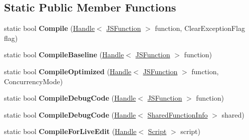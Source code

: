 \subsection*{Static Public Member Functions}
\begin{DoxyCompactItemize}
\item 
static bool {\bfseries Compile} (\hyperlink{classv8_1_1internal_1_1_handle}{Handle}$<$ \hyperlink{classv8_1_1internal_1_1_j_s_function}{J\+S\+Function} $>$ function, Clear\+Exception\+Flag flag)\hypertarget{classv8_1_1internal_1_1_compiler_afbc8e9fe9de9febf48d6c71c79978671}{}\label{classv8_1_1internal_1_1_compiler_afbc8e9fe9de9febf48d6c71c79978671}

\item 
static bool {\bfseries Compile\+Baseline} (\hyperlink{classv8_1_1internal_1_1_handle}{Handle}$<$ \hyperlink{classv8_1_1internal_1_1_j_s_function}{J\+S\+Function} $>$ function)\hypertarget{classv8_1_1internal_1_1_compiler_a4d1fa633e8cdfb55a5ffab3439c8acd6}{}\label{classv8_1_1internal_1_1_compiler_a4d1fa633e8cdfb55a5ffab3439c8acd6}

\item 
static bool {\bfseries Compile\+Optimized} (\hyperlink{classv8_1_1internal_1_1_handle}{Handle}$<$ \hyperlink{classv8_1_1internal_1_1_j_s_function}{J\+S\+Function} $>$ function, Concurrency\+Mode)\hypertarget{classv8_1_1internal_1_1_compiler_ad629d712fc453a783d180175348eec1e}{}\label{classv8_1_1internal_1_1_compiler_ad629d712fc453a783d180175348eec1e}

\item 
static bool {\bfseries Compile\+Debug\+Code} (\hyperlink{classv8_1_1internal_1_1_handle}{Handle}$<$ \hyperlink{classv8_1_1internal_1_1_j_s_function}{J\+S\+Function} $>$ function)\hypertarget{classv8_1_1internal_1_1_compiler_aa49dfc9224726906f329c32274f46741}{}\label{classv8_1_1internal_1_1_compiler_aa49dfc9224726906f329c32274f46741}

\item 
static bool {\bfseries Compile\+Debug\+Code} (\hyperlink{classv8_1_1internal_1_1_handle}{Handle}$<$ \hyperlink{classv8_1_1internal_1_1_shared_function_info}{Shared\+Function\+Info} $>$ shared)\hypertarget{classv8_1_1internal_1_1_compiler_a71799a2bafb98d21f59bf8a2119bcb99}{}\label{classv8_1_1internal_1_1_compiler_a71799a2bafb98d21f59bf8a2119bcb99}

\item 
static bool {\bfseries Compile\+For\+Live\+Edit} (\hyperlink{classv8_1_1internal_1_1_handle}{Handle}$<$ \hyperlink{classv8_1_1internal_1_1_script}{Script} $>$ script)\hypertarget{classv8_1_1internal_1_1_compiler_a3aa844a40bf148cf66f7a08159d62818}{}\label{classv8_1_1internal_1_1_compiler_a3aa844a40bf148cf66f7a08159d62818}


\end{DoxyCompactItemize}
